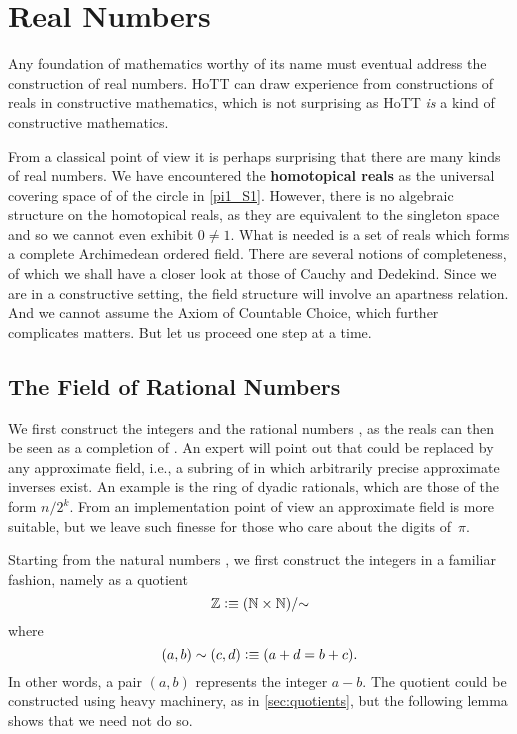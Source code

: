 \newcommand{\rclim}{\mathsf{lim}} %
\newcommand{\rcrat}{\mathsf{rat}} %
\newcommand{\CAP}{\mathcal{C}}    %
\newcommand{\Qp}{\Q_{+}}

\chapter{Real Numbers}
\label{cha:real-numbers}

Any foundation of mathematics worthy of its name must eventual address the construction of
real numbers. HoTT can draw experience from constructions of reals in constructive
mathematics, which is not surprising as HoTT \emph{is} a kind of constructive mathematics.

From a classical point of view it is perhaps surprising that there are many kinds of real
numbers. We have encountered the \textbf{homotopical reals} as the universal covering
space of of the circle in \autoref{pi1_S1}. However, there is no algebraic structure on
the homotopical reals, as they are equivalent to the singleton space and so we cannot even
exhibit $0 \neq 1$. What is needed is a set of reals which forms a complete Archimedean
ordered field. There are several notions of completeness, of which we shall have a closer
look at those of Cauchy and Dedekind. Since we are in a constructive setting, the field
structure will involve an apartness relation. And we cannot assume the Axiom of Countable
Choice, which further complicates matters. But let us proceed one step at a time.

\section{The Field of Rational Numbers}
\label{sec:field-rati-numb}

We first construct the integers \Z and the rational numbers \Q, as the reals can then be
seen as a completion of \Q. An expert will point out that \Q could be replaced by any
approximate field, i.e., a subring of \Q in which arbitrarily precise approximate inverses
exist. An example is the ring of dyadic rationals, which are those of the form $n/2^k$.
From an implementation point of view an approximate field is more suitable, but we leave
such finesse for those who care about the digits of~$\pi$.

Starting from the natural numbers \N, we first construct the integers in a familiar
fashion, namely as a quotient
%
\[ \mathbb{Z} \vcentcolon\equiv (\mathbb{N} \times \mathbb{N})/{\sim} \]
%
where
%
\[ (a,b) \sim (c,d) \vcentcolon\equiv (a + d = b + c). \]
%
In other words, a pair $(a,b)$ represents the integer $a - b$. The quotient could be
constructed using heavy machinery, as in \autoref{sec:quotients}, but the following lemma
shows that we need not do so.


